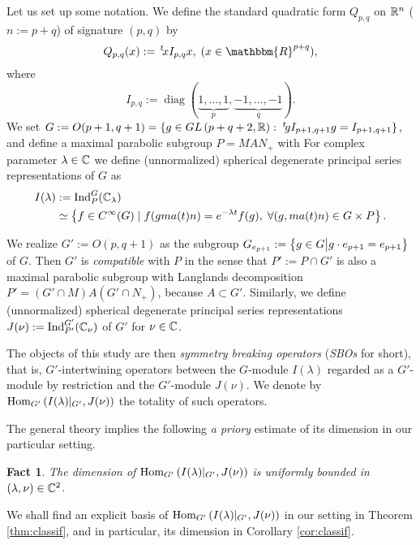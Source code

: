 \documentclass[12pt]{article} %
\newcommand{\assign}{:=}
\newcommand{\tmop}[1]{\ensuremath{\operatorname{#1}}}
\newcommand{\Hom}{\mbox{\normalfont Hom}}
\newcommand{\Ind}{\mbox{\normalfont Ind}}
\newtheorem{fact}{Fact}
\theoremstyle{definition}
\theoremstyle{exampstyle} \newtheorem{examp}[theorem]{Theorem}
\renewcommand{\Q}{Q_{p,q}}
\newcommand{\IlambdaGprime}{I(\lambda)\kern-0.3em\mid_{G'}}
\newcommand{\SBO}{\Hom_{G'}\left(\IlambdaGprime,J(\nu) \right)}
\begin{document}
  \begin{versiona}
	  Let us set up some notation. We define the standard quadratic form
	  $\Q$ on $\mathbb{R}^n$ ($n:=p+q$) of signature $(p,q)$ by
	  \begin{equation*}
  \Q (x) \assign \,^t \! x I_{p, q} x, \; (x \in
  \mathbbm{R}^{p + q}),
	  \end{equation*}
	  where
\begin{equation*}
   I_{p, q} \assign \tmop{diag} (\underbrace{1, \ldots, 1}_p, \underbrace{-
  1, \ldots, - 1}_q).
\end{equation*}
We set $G \assign O (p +
1, q + 1)=\left\{ g\in GL\left( p+q+2,\R \right):\;^t\!gI_{p+1,q+1}g=I_{p+1,q+1} \right\}$, and define
a maximal parabolic subgroup $P=MAN_{+}$ with
For complex parameter $\lambda\in\mathbb{C}$ we define (unnormalized) spherical degenerate principal series representations of $G$ as
\begin{align*}
I(\lambda)&:=\Ind_P^G(\C_\lambda)\\
&\simeq \left\{ f\in C^{\infty}(G)\mid f(gma(t)n)=e^{-\lambda t}f(g),\;\forall(g,ma(t)n)\in G\times P \right\}.
\end{align*}

We realize $G':=O(p,q+1)$ as the subgroup $G_{e_{p+1}}:=\left\{g \in G\big| g \cdot e_{p + 1} = e_{p + 1}\right\}$ of $G$. 
Then $G'$ is {\it compatible} with $P$ in the sense that 
$P':=P\cap G'$ is also a maximal parabolic subgroup
with Langlands decomposition $P'=(G'\cap M)A (G'\cap N_+)$,
because $A\subset G'$.
Similarly, we define (unnormalized) spherical degenerate principal series representations $J(\nu):=\Ind_{P'}^{G'}(\C_{\nu})$ of $G'$ for $\nu\in\mathbb{C}$.

The objects of this study are then \textit{symmetry breaking operators} (\textit{SBOs} for short),
that is, $G'$-intertwining operators between the $G$-module $I(\lambda)$ regarded as a $G'$-module by restriction and the $G'$-module $J(\nu)$. We denote by $\SBO$ the totality
of such operators.

The general theory \cite{kobayashi2013finite,kobayashi2014classification} implies the following {\it a priory} estimate of its dimension in our particular setting.
\begin{fact}
	The dimension of $\SBO$ is uniformly bounded in $(\lambda,\nu)\in\mathbb{C}^2$.
\end{fact}
We shall find an explicit basis of $\SBO$ in our setting in Theorem \ref{thm:classif}, and in particular, its dimension in Corollary \ref{cor:classif}.


\end{versiona}
\end{document}
